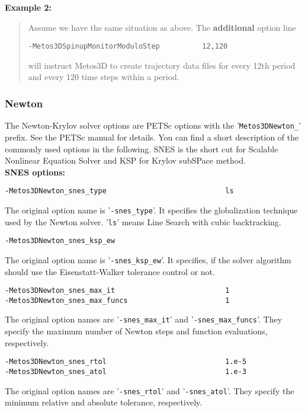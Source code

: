 \documentclass{article}
\begin{document}
\textbf{Example 2:}
\begin{quote}
Assume we have the same situation as above. The \textbf{additional} option line
\begin{verbatim}
-Metos3DSpinupMonitorModuloStep          12,120
\end{verbatim}
will instruct Metos3D to create trajectory data files for every 12th
period and every 120 time steps within a period.
\end{quote}

\subsubsection{Newton}

The Newton-Krylov solver options are PETSc options with the
'\texttt{Metos3DNewton\_}' prefix. See the PETSc manual for details.
You can find a short description of the commonly used options
in the following. SNES is the short cut for Scalable Nonlinear
Equation Solver and KSP for Krylov subSPace method. \\

\textbf{SNES options:}

\begin{verbatim}
-Metos3DNewton_snes_type                            ls
\end{verbatim}
The original option name is '\texttt{-snes\_type}'. It specifies the
globalization technique used by the Newton solver. '\texttt{ls}'
means Line Search with cubic backtracking.

\begin{verbatim}
-Metos3DNewton_snes_ksp_ew
\end{verbatim}
The original option name is '\texttt{-snes\_ksp\_ew}'. It specifies,
if the solver algorithm should use the Eisenstatt-Walker \cite{EisWal96}
tolerance control or not.

\begin{verbatim}
-Metos3DNewton_snes_max_it                          1
-Metos3DNewton_snes_max_funcs                       1
\end{verbatim}
The original option names are '\texttt{-snes\_max\_it}' and '\texttt{-snes\_max\_funcs}'.
They specify the maximum number of Newton steps and function evaluations,
respectively.

\begin{verbatim}
-Metos3DNewton_snes_rtol                            1.e-5
-Metos3DNewton_snes_atol                            1.e-3
\end{verbatim}
The original option names are '\texttt{-snes\_rtol}' and '\texttt{-snes\_atol}'.
They specify the minimum relative and absolute tolerance,
respectively.
\end{document}
